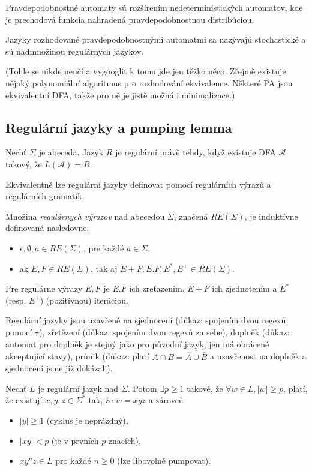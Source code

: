 Pravdepodobnostné automaty sú rozšírením nedeterministických
automatov, kde je prechodová funkcia nahradená pravdepodobnostnou
distribúciou.

Jazyky rozhodované pravdepodobnostnými automatmi sa nazývajú stochastické
a sú nadmnožinou regulárnych jazykov.


(Tohle se nikde neučí a vygooglit k tomu jde jen těžko něco. Zřejmě
existuje nějaký polynomiální algoritmus pro rozhodování ekvivalence.
Některé PA jsou ekvivalentní DFA, takže pro ně je jistě možná i
minimalizace.)

\subsection{Regulární jazyky a pumping lemma}

\begin{definition}
Nechť $\Sigma$ je abeceda. Jazyk $R$ je regulární právě tehdy, když
existuje DFA $\mathcal{A}$ takový, že $L(\mathcal{A}) = R$.
\end{definition}

Ekvivalentně lze regulární jazyky definovat pomocí regulárních výrazů a
regulárních gramatik.

\begin{definition}
	Množina {\em regulárnych výrazov} nad abecedou $\Sigma$,
	značená $RE(\Sigma)$, je induktívne definovaná nasledovne:
	\begin{itemize}
		\item $\epsilon, \emptyset, a \in RE(\Sigma)$, pre každé $a \in \Sigma$,
		\item ak $E,F \in RE(\Sigma)$, tak aj $E+F, E.F, E^*, E^+ \in RE(\Sigma)$.
	\end{itemize}
\end{definition}

Pre regulárne výrazy $E,F$ je $E.F$ ich zreťazením, $E+F$ ich zjednotením a 
$E^*$ (resp. $E^+$) (pozitívnou) iteráciou.


Regulární jazyky jsou uzavřené na sjednocení (důkaz: spojením
dvou regexů pomocí \verb|+|), zřetězení (důkaz: spojením dvou
regexů za sebe), doplněk (důkaz: automat pro doplněk je stejný
jako pro původní jazyk, jen má obrácené akceptující stavy), průnik
(důkaz: platí $A \cap B = \overline{\overline{A} \cup \overline{B}}$ a
uzavřenost na doplněk a sjednocení jsme již dokázali).

\begin{theorem}
Nechť $L$ je regulární jazyk nad $\Sigma$.
Potom
$\exists p \geq 1$ takové,
že $\forall w \in L, \lvert w \rvert \geq p$,
platí, že existují $x,y,z \in \Sigma^*$ tak, že $w = xyz$ a zároveň

\begin{itemize}
    \item $\lvert y \rvert \geq 1$ (cyklus je neprázdný),
    \item $\lvert xy \rvert < p$ (je v prvních $p$ znacích),
    \item $xy^nz \in L$ pro každé $n \geq 0$ (lze libovolně pumpovat).
\end{itemize}
\end{theorem}

